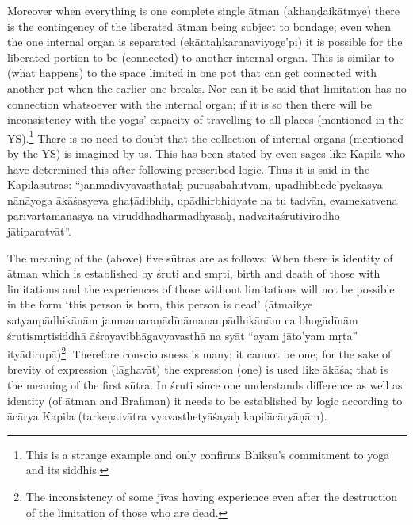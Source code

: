 


\eject

Moreover when everything is one complete single ātman (akhaṇḍaikātmye) there is the contingency of the liberated ātman being subject to bondage; even when the one internal organ is separated (ekāntaḥkara\-ṇaviyoge’pi) it is possible for the liberated portion to be (connected) to another internal organ. This is similar to (what happens) to the space limited in one pot that can get connected with another pot when the earlier one breaks. Nor can it be said that limitation has no connection whatsoever with the internal organ; if it is so then there will be inconsistency with the yogīs’ capacity of travelling to all places (mentioned in the YS).\footnote{This is a strange example and only confirms Bhikṣu’s commitment to yoga and its siddhis.} There is no need to doubt that the collection of internal organs (mentioned by the YS)  is imagined by us. This has been stated by even sages like Kapila who have determined this after following prescribed logic. Thus it is said in the Kapilasūtras: “janmādivyavasthātaḥ puruṣabahutvam, upādhibhede’pyekasya nānāyoga ākāśasyeva ghaṭā\-dibhiḥ, upādhirbhidyate na tu tadvān, evamekatvena parivartamāna\-sya na viruddhadharmādhyāsaḥ, nādvaitaśrutivirodho jātiparatvāt”. 

The meaning of the (above) five sūtras are as follows: When there is identity of ātman   which is established by śruti and smṛti, birth and death of those with limitations and the experiences of those without limitations will not be possible in the form ‘this person is born, this person is dead’ (ātmaikye satyaupādhikānām janmamaraṇādīnāmana\-upādhikānām ca bhogādīnām śrutismṛtisiddhā āśrayavibhāgavyava\-sthā na syāt “ayam jāto’yam mṛta” ityādirupā)\footnote{The inconsistency of some jīvas having experience even after the destruction of the limitation of those who are dead.}. Therefore consciousness is many; it cannot be one; for the sake of brevity of expression (lāghavāt) the expression (one) is used like ākāśa; that is the meaning of the first sūtra. In śruti since one understands difference as well as identity (of ātman and Brahman) it needs to be established by logic according to ācārya Kapila (tarkeṇaivātra vyavasthetyāśayaḥ kapilācāryāṇām).

